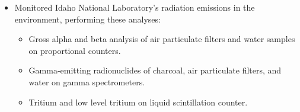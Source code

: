 \workspace
    {
    \begin{itemize}
    \item Monitored Idaho National Laboratory's radiation emissions in the environment, performing these analyses:
    \begin{itemize}
    \item Gross alpha and beta analysis of air particulate filters and water samples on proportional counters.
    \item Gamma-emitting radionuclides of charcoal, air particulate filters, and water on gamma spectrometers.
    \item Tritium and low level tritium on liquid scintillation counter.
    \end{itemize}
    \end{itemize}
    }
    
